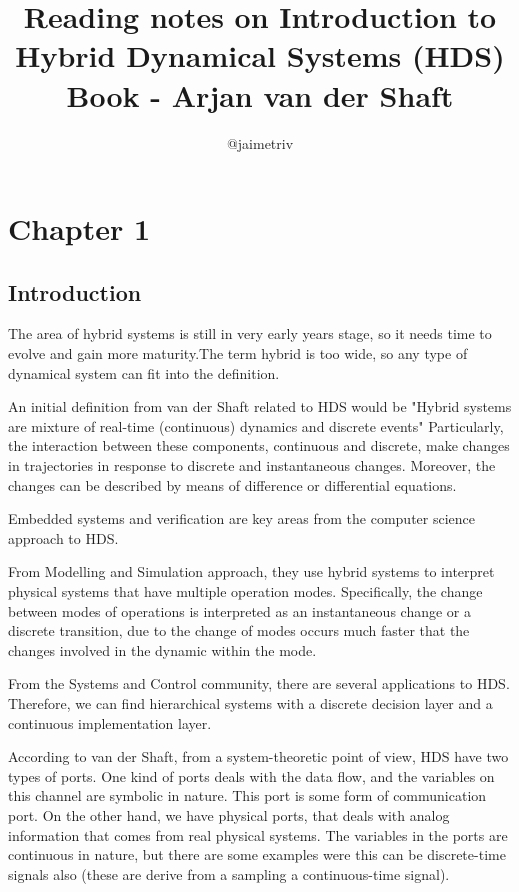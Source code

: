 \documentclass[12pt]{article}
\title{Reading notes on Introduction to Hybrid Dynamical Systems (HDS) Book - Arjan van der Shaft}
\author{@jaimetriv}
\begin{document}
\maketitle


\section{Chapter 1}
\subsection{Introduction}
The area of hybrid systems is still in very early years stage, so it needs time to evolve and gain more maturity.The term hybrid is too wide, so any type of dynamical system can fit into the definition.\par
An initial definition from van der Shaft related to HDS would be "Hybrid systems are mixture of real-time (continuous) dynamics and discrete events" Particularly, the interaction between these components, continuous and discrete, make changes in trajectories in response to discrete and instantaneous changes. Moreover, the changes can be described by means of difference or differential equations.\par
Embedded systems and verification are key areas from the computer science approach to HDS.\par
From Modelling and Simulation approach, they use hybrid systems to interpret physical systems that have multiple operation modes. Specifically, the change between modes of operations is interpreted as an instantaneous change or a discrete transition, due to the change of modes occurs much faster that the changes involved in the dynamic within the mode.\par
From the Systems and Control community, there are several applications to HDS. Therefore, we can find hierarchical systems with a discrete decision layer and a continuous implementation layer.\par
According to van der Shaft, from a system-theoretic point of view, HDS have two types of ports. One kind of ports deals with the data flow, and the variables on this channel are symbolic in nature. This port is some form of communication port. On the other hand, we have physical ports, that deals with analog  information that comes from real physical systems. The variables in the ports are continuous in nature, but there are some examples were this can be discrete-time signals also (these are derive from a sampling a continuous-time signal).\par
\end{document}
